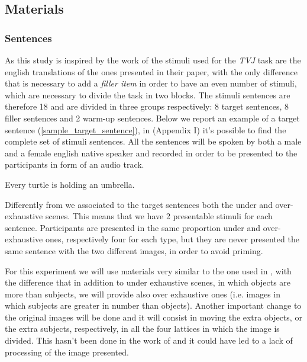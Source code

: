 \documentclass[10pt, a4]{article}
\begin{document}
\subsection{Materials}
\subsubsection{Sentences}
As this study is inspired by the work of \cite{minai2012hinders} the stimuli used for the \textit{TVJ} task are the
english translations of the ones presented in their paper, with the only difference that is necessary to add a
\textit{filler item} in order to have an even number of stimuli, which are necessary to divide the task in two blocks.
The stimuli sentences are therefore 18 and are divided in three groups respectively: 8 target sentences, 8 filler sentences
and 2 warm-up sentences. Below we report an example of a target sentence (\ref{sample_target_sentence}), in (Appendix I) it's possible
to find the complete set of stimuli sentences. All the sentences will be spoken by both a male and a female english native speaker and
recorded in order to be presented to the participants in form of an audio track.

\begin{exe}
    \ex  Every turtle is holding an umbrella. \label{sample_target_sentence}
\end{exe}

Differently from \cite{minai2012hinders} we associated to the target sentences both the under and over-exhaustive scenes. This means
that we have 2 presentable stimuli for each sentence. Participants are presented in the same proportion under and over-exhaustive ones,
respectively four for each type, but they are never presented the same sentence with the two different images, in order to avoid priming.



For this experiment we will use materials very similar to the one used in \cite{minai2012hinders},
with the difference that in addition to under exhaustive scenes, in which objects are more than subjects,
we will provide also over exhaustive ones (i.e. images in which subjects are greater in number than objects).
Another important change to the original images will be done and it will consist in moving
the extra objects, or the extra subjects, respectively, in all the four lattices in which
the image is divided. This hasn't been done in the work of \cite{minai2012hinders} and it could
have led to a lack of processing of the image presented.
\end{document}
